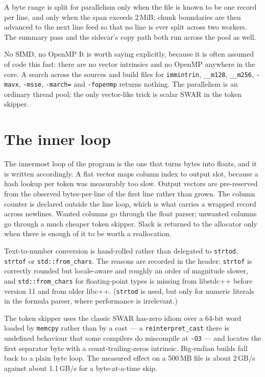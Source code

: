 \documentclass[11pt,a4paper,oneside]{report}
\newcommand{\code}[1]{\texttt{#1}}
\begin{document}
A byte range is split for parallelism only when the file is known to be one
record per line, and only when the span exceeds 2\,MiB; chunk boundaries are then
advanced to the next line feed so that no line is ever split across two workers.
The summary pass and the sidecar's copy path both run across the pool as well.

\begin{aoenote}{No SIMD, no OpenMP}
It is worth saying explicitly, because it is often assumed of code this fast:
there are no vector intrinsics and no OpenMP anywhere in the core. A search
across the sources and build files for \code{immintrin}, \code{\_\_m128},
\code{\_\_m256}, \code{-mavx}, \code{-msse}, \code{-march=} and
\code{-fopenmp} returns nothing. The parallelism is an ordinary thread pool; the
only vector-like trick is scalar SWAR in the token skipper.
\end{aoenote}

\section{The inner loop}

The innermost loop of the program is the one that turns bytes into floats, and it
is written accordingly. A flat vector maps column index to output slot, because a
hash lookup per token was measurably too slow. Output vectors are pre-reserved
from the observed bytes-per-line of the first line rather than grown. The column
counter is declared outside the line loop, which is what carries a wrapped record
across newlines. Wanted columns go through the float parser; unwanted columns go
through a much cheaper token skipper. Slack is returned to the allocator only
when there is enough of it to be worth a reallocation.

Text-to-number conversion is hand-rolled rather than delegated to
\code{strtod}, \code{strtof} or \code{std::from\_chars}. The reasons are recorded
in the header: \code{strtof} is correctly rounded but locale-aware and roughly an
order of magnitude slower, and \code{std::from\_chars} for floating-point types
is missing from libstdc++ before version 11 and from older libc++.
(\code{strtod} is used, but only for numeric literals in the formula parser,
where performance is irrelevant.)

The token skipper uses the classic SWAR has-zero idiom over a 64-bit word loaded
by \code{memcpy} rather than by a cast --- a \code{reinterpret\_cast} there is
undefined behaviour that some compilers do miscompile at \code{-O3} --- and
locates the first separator byte with a count-trailing-zeros intrinsic.
Big-endian builds fall back to a plain byte loop. The measured effect on a
500\,MB file is about 2\,GB/s against about 1.1\,GB/s for a byte-at-a-time skip.
\end{document}
